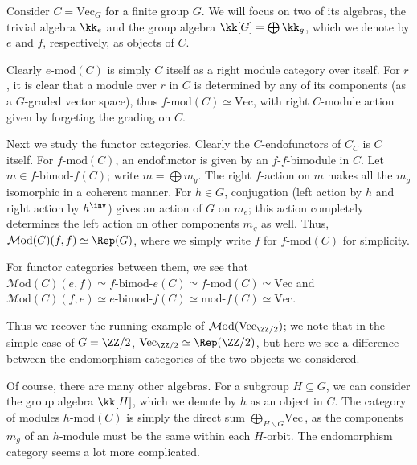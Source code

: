 \documentclass[12pt]{article}
\newcommand{\Mod}{{\mathcal{M}\textrm{od}}}
\newcommand{\Vect}{{\textrm{Vec}}}
\newcommand{\bimod}[2]{{#1\textrm{-bimod-}#2}}
\newcommand{\amod}[1]{{#1\textrm{-mod}}}
\newcommand{\moda}[1]{{\textrm{mod-}#1}}
\newcommand{\ModA}[1]{{\Mod(#1)}}
\begin{document}
\begin{example}
Consider $C = \Vect_{G}$ for a finite group $G$.
We will focus on two of its algebras,
the trivial algebra $\kk_e$
and the group algebra $\kk[G] = \bigoplus \kk_g$,
which we denote by $e$ and $f$, respectively,
as objects of $C$.

Clearly $\amod{e}(C)$ is simply $C$ itself
as a right module category over itself.
For $r$, it is clear that a module over $r$ in $C$
is determined by any of its components
(as a $G$-graded vector space),
thus $\amod{f}(C) \simeq \Vect$,
with right $C$-module action given by forgeting
the grading on $C$.

Next we study the functor categories.
Clearly the $C$-endofunctors of $C_C$ is $C$ itself.
For $\amod{f}(C)$,
an endofunctor is given by an $f$-$f$-bimodule in $C$.
Let $m \in \bimod{f}{f}(C)$;
write $m = \bigoplus m_g$.
The right $f$-action on $m$ makes all the $m_g$ isomorphic
in a coherent manner.
For $h \in G$, conjugation (left action by $h$ and right action
by $h^\inv$) gives an action of $G$ on $m_e$;
this action completely determines the left action
on other components $m_g$ as well.
Thus, $\ModA{C}(f,f) \simeq \Rep(G)$,
where we simply write $f$ for $\amod{f}(C)$ for simplicity.

For functor categories between them, we see that
$\ModA{C}(e,f) \simeq \bimod{f}{e}(C) \simeq \amod{f}(C)
\simeq \Vect$
and
$\ModA{C}(f,e) \simeq \bimod{e}{f}(C) \simeq \moda{f}(C)
\simeq \Vect$.

Thus we recover the running example of $\ModA{\Vect_{\ZZ/2}}$;
we note that in the simple case of $G = \ZZ/2$,
$\Vect_{\ZZ/2} \simeq \Rep(\ZZ/2)$,
but here we see a difference between the endomorphism
categories of the two objects we considered.


Of course, there are many other algebras.
For a subgroup $H \subseteq G$,
we can consider the group algebra $\kk[H]$,
which we denote by $h$ as an object in $C$.
The category of modules $\amod{h}(C)$
is simply the direct sum $\bigoplus_{H \backslash G} \Vect$,
as the components $m_g$ of an $h$-module
must be the same within each $H$-orbit.
The endomorphism category seems a lot more complicated.
\end{example}
\end{document}
